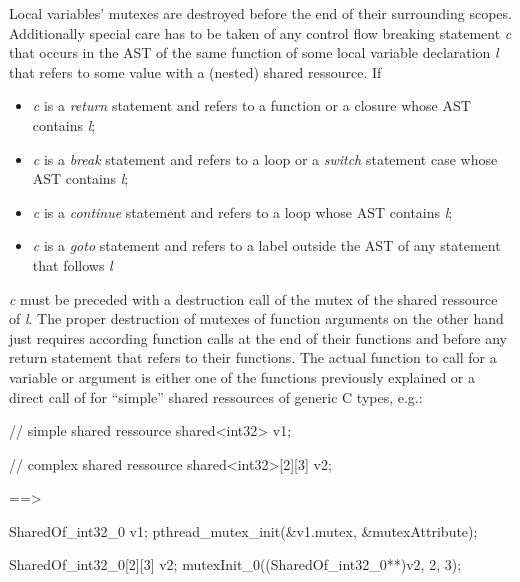 Local variables' mutexes are destroyed before the end of their surrounding scopes. Additionally special care has to be taken of any control flow breaking statement \textit{c} that occurs in the AST of the same function of some local variable declaration \textit{l} that refers to some value with a (nested) shared ressource. If 
\begin{itemize}
\item \textit{c} is a \textit{return} statement and refers to a function or a closure whose AST contains \textit{l};
\item \textit{c} is a \textit{break} statement and refers to a loop or a \textit{switch} statement case whose AST contains \textit{l};
\item \textit{c} is a \textit{continue} statement and refers to a loop whose AST contains \textit{l};
\item \textit{c} is a \textit{goto} statement and refers to a label outside the AST of any statement that follows \textit{l}
\end{itemize}
\textit{c} must be preceded with a destruction call of the mutex of the shared ressource of \textit{l}.  The proper destruction of mutexes of function arguments on the other hand just requires according function calls at the end of their functions and before any return statement that refers to their functions. 
The actual function to call for a variable or argument is either one of the  functions previously explained or a direct call of  for ``simple'' shared ressources of generic C types, e.g.:
\begin{center}
\begin{minipage}{0.3\textwidth}
\begin{ccode}
// simple shared ressource
shared<int32> v1;

// complex shared ressource
shared<int32>[2][3] v2;
\end{ccode}
\end{minipage}
\qquad==>\qquad\qquad
\begin{minipage}{0.4\textwidth}
\begin{ccode}
SharedOf_int32_0 v1;
pthread_mutex_init(&v1.mutex, &mutexAttribute);

SharedOf_int32_0[2][3] v2;
mutexInit_0((SharedOf_int32_0**)v2, 2, 3);
\end{ccode}
\end{minipage}
\end{center}

